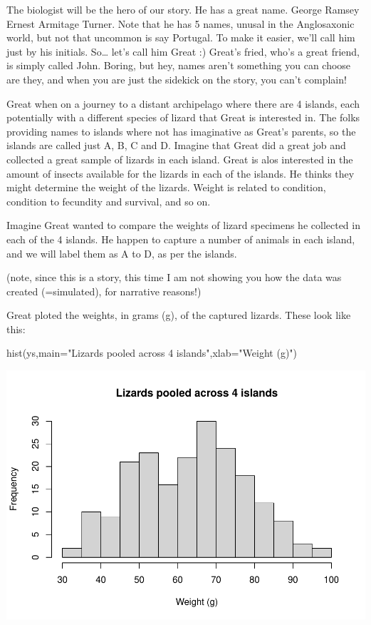 \documentclass[
]{book}
\newenvironment{Shaded}{\begin{snugshade}}{\end{snugshade}}
\newcommand{\AttributeTok}[1]{\textcolor[rgb]{0.77,0.63,0.00}{#1}}
\newcommand{\FunctionTok}[1]{\textcolor[rgb]{0.00,0.00,0.00}{#1}}
\newcommand{\NormalTok}[1]{#1}
\newcommand{\StringTok}[1]{\textcolor[rgb]{0.31,0.60,0.02}{#1}}
\begin{document}
The biologist will be the hero of our story. He has a great name. George Ramsey Ernest Armitage Turner. Note that he has 5 names, unusal in the Anglosaxonic world, but not that uncommon is say Portugal. To make it easier, we'll call him just by his initials. So\ldots{} let's call him Great :) Great's fried, who's a great friend, is simply called John. Boring, but hey, names aren't something you can choose are they, and when you are just the sidekick on the story, you can't complain!

Great when on a journey to a distant archipelago where there are 4 islands, each potentially with a different species of lizard that Great is interested in. The folks providing names to islands where not has imaginative as Great's parents, so the islands are called just A, B, C and D. Imagine that Great did a great job and collected a great sample of lizards in each island. Great is alos interested in the amount of insects available for the lizards in each of the islands. He thinks they might determine the weight of the lizards. Weight is related to condition, condition to fecundity and survival, and so on.

Imagine Great wanted to compare the weights of lizard specimens he collected in each of the 4 islands. He happen to capture a number of animals in each island, and we will label them as A to D, as per the islands.

(note, since this is a story, this time I am not showing you how the data was created (=simulated), for narrative reasons!)

Great ploted the weights, in grams (g), of the captured lizards. These look like this:

\begin{Shaded}
\begin{Highlighting}[]
\FunctionTok{hist}\NormalTok{(ys,}\AttributeTok{main=}\StringTok{"Lizards pooled across 4 islands"}\NormalTok{,}\AttributeTok{xlab=}\StringTok{"Weight (g)"}\NormalTok{)}
\end{Highlighting}
\end{Shaded}

\includegraphics{ECOMODbook_files/figure-latex/a10.2-1.pdf}
\end{document}
